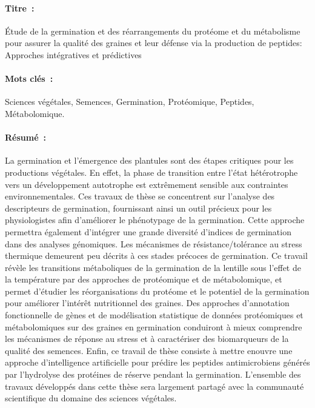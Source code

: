 \documentclass[12pt,a4paper]{reedthesis}
\begin{document}
\begin{mdframed}[linecolor=Prune,linewidth=1]
\vspace{-.25cm}
\paragraph*{Titre~:} Étude de la germination et des réarrangements du protéome et du métabolisme pour assurer la qualité des graines et leur défense via la production de peptides: Approches intégratives et prédictives
\begin{small}
\vspace{-.25cm}
\paragraph*{Mots clés~:} Sciences végétales, Semences, Germination, Protéomique, Peptides, Métabolomique.

\vspace{-.5cm}
\begin{multicols}{2}
\paragraph*{Résumé~:} La germination et l'émergence des plantules sont des étapes critiques pour les productions végétales. En effet, la phase de transition entre l'état hétérotrophe vers un développement autotrophe est extrêmement sensible aux contraintes environnementales. Ces travaux de thèse se concentrent sur l'analyse des descripteurs de germination, fournissant ainsi un outil précieux pour les physiologistes afin d'améliorer le phénotypage de la germination. Cette approche permettra également d'intégrer une grande diversité d'indices de germination dans des analyses génomiques. Les mécanismes de résistance/tolérance au stress thermique demeurent peu décrits à ces stades précoces de germination. Ce travail révèle les transitions métaboliques de la germination de la lentille sous l'effet de la température par des approches de protéomique et de métabolomique, et permet d'étudier les réorganisations du protéome et le potentiel de la germination pour améliorer l'intérêt nutritionnel des graines. Des approches d'annotation fonctionnelle de gènes et de modélisation statistique de données protéomiques et métabolomiques sur des graines en germination conduiront à mieux comprendre les mécanismes de réponse au stress et à caractériser des biomarqueurs de la qualité des semences. Enfin, ce travail de thèse consiste à mettre enouvre une approche d'intelligence artificielle pour prédire les peptides antimicrobiens générés par l'hydrolyse des protéines de réserve pendant la germination. L'ensemble des travaux développés dans cette thèse sera largement partagé avec la communauté scientifique du domaine des sciences végétales.
\end{multicols}
\end{small}
\end{mdframed}
\end{document}
